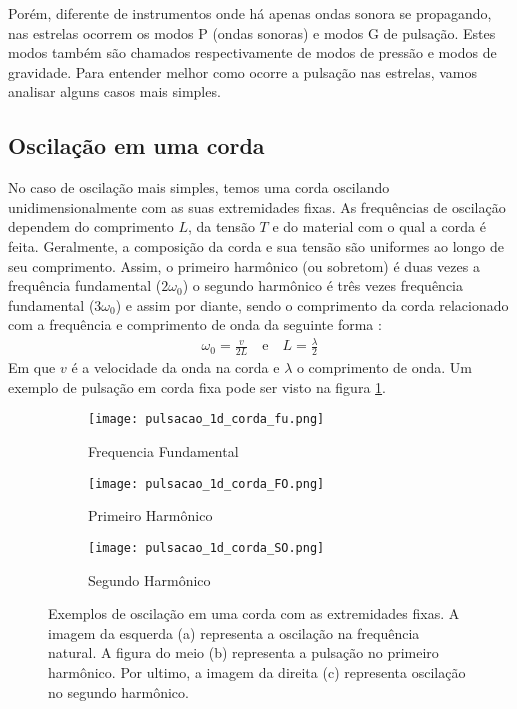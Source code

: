 Porém, diferente de instrumentos onde há apenas ondas sonora se propagando, nas estrelas ocorrem os modos P (ondas sonoras) e modos G de pulsação. Estes modos também são chamados respectivamente de modos de pressão e modos de gravidade. Para entender melhor como ocorre a pulsação nas estrelas, vamos analisar alguns casos mais simples.

\subsection{Oscilação em uma corda}
No caso de oscilação mais simples, temos uma corda oscilando unidimensionalmente com as suas extremidades fixas. As frequências de oscilação dependem do comprimento $L$, da tensão $T$ e do material com o qual a corda é feita. Geralmente, a composição da corda e sua tensão são uniformes ao longo de seu comprimento. Assim, o primeiro harmônico (ou sobretom) é duas vezes a frequência fundamental ($2\omega_0$) o segundo harmônico é três vezes frequência fundamental ($3\omega_0$) e assim por diante, sendo o comprimento da corda relacionado com a frequência e comprimento de onda da seguinte forma \citep{astroseis}:
\begin{align}
\omega_0 = \frac{v}{2L} \quad \text{e} \quad L = \frac{\lambda}{2}
\end{align}
Em que $v$ é a velocidade da onda na corda e $\lambda$ o comprimento de onda. Um exemplo de pulsação em corda fixa pode ser visto na figura \ref{fig:corda}.

\begin{figure}[!ht]
\centering
\begin{subfigure}{.33\textwidth}
  \centering
  \texttt{[image: pulsacao\_1d\_corda\_fu.png]}
  \caption{Frequencia Fundamental}
\end{subfigure}%
\begin{subfigure}{.33\textwidth}
  \centering
  \texttt{[image: pulsacao\_1d\_corda\_FO.png]}
  \caption{Primeiro Harmônico}
\end{subfigure}
\begin{subfigure}{.33\textwidth}
  \centering
  \texttt{[image: pulsacao\_1d\_corda\_SO.png]}
  \caption{Segundo Harmônico}
\end{subfigure}
\caption[Oscilação em uma corda com extremidades fixas]{Exemplos de oscilação em uma corda com as extremidades fixas. A imagem da esquerda (a) representa a oscilação na frequência natural. A figura do meio (b) representa a pulsação no primeiro harmônico. Por ultimo, a imagem da direita (c) representa oscilação no segundo harmônico.}
\label{fig:corda}
\end{figure}

